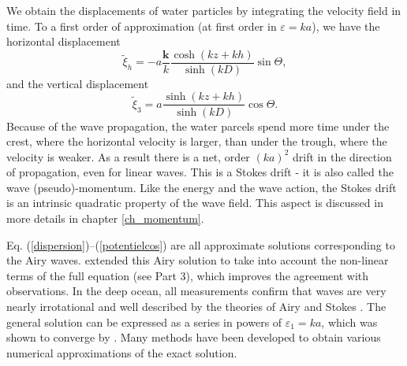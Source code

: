 

We obtain the displacements of water particles by integrating the velocity field in 
time. To a first order of approximation (at first order in $\varepsilon=ka$),
we have the horizontal displacement
\begin{equation}
     \widetilde{\xi}_h = - a \frac{{\mathbf k}}{k}
    \frac{\cosh\left(kz+kh\right)}{\sinh\left(kD\right)}
    \sin \Theta,
      \label{xi1}
\end{equation} and the vertical displacement
\begin{equation}
    \widetilde{\xi}_3 =a
    \frac{\sinh\left(kz+kh\right)}{\sinh\left(kD\right)}
    \cos \Theta \label{xi3}.
\end{equation}
Because of the wave propagation, the water parcels spend more time under the crest, where the horizontal 
velocity is larger, than under the trough, where the velocity is weaker. As a result there is a net, order $(ka)^2$ drift in the direction 
of propagation, even for linear waves. This is a Stokes drift - it is also called the wave (pseudo)-momentum. Like the energy and the wave action, the Stokes 
drift is an intrinsic quadratic property 
of the wave field. This aspect is discussed in more details in chapter \ref{ch_momentum}. 

Eq. (\ref{dispersion})--(\ref{potentielcos}) are all approximate solutions corresponding to the Airy waves. \cite{Stokes1849} extended this Airy solution 
to take into account the non-linear terms of the full equation (see Part 3), which improves the agreement with observations.
In the deep ocean, all measurements confirm that waves are very nearly irrotational and well described
by the theories of Airy and Stokes
\citep[see for example ][]{Thornton&Kraphol1974,Herbers&al.1992}. The general solution can be expressed as a 
series in powers of 
$\varepsilon_1=ka$, which was shown to converge by \cite{Levi-Civita1925}. Many methods have been developed to 
obtain various numerical approximations of the exact solution.

